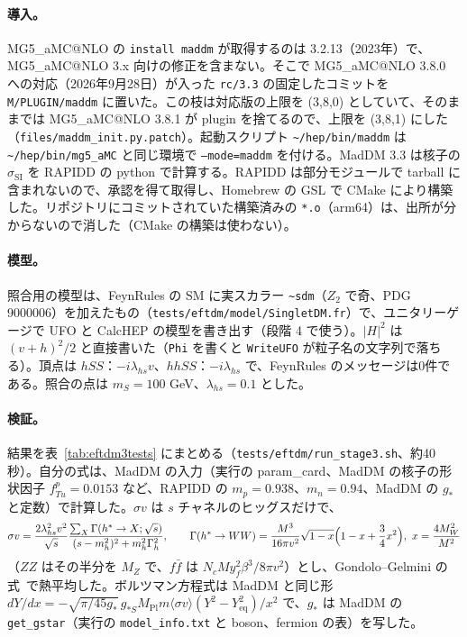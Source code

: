 \documentclass[a4paper,10pt]{ltjsarticle}
\makeatletter
\newcommand{\MGaMC}{MG5\_aMC@NLO}
\newcommand{\pth}[1]{\texttt{\textasciitilde/}\nolinkurl{#1}}
\makeatother
\begin{document}
\paragraph{導入。}\MGaMC{} の \texttt{install maddm} が取得するのは 3.2.13（2023年）で、\MGaMC{} 3.x 向けの修正を含まない。そこで \MGaMC{} 3.8.0 への対応（2026年9月28日）が入った \texttt{rc/3.3} の固定したコミットを \texttt{M/PLUGIN/maddm} に置いた。この枝は対応版の上限を (3,8,0) としていて、そのままでは \MGaMC{} 3.8.1 が plugin を捨てるので、上限を (3,8,1) にした（\nolinkurl{files/maddm_init.py.patch}）。起動スクリプト \pth{hep/bin/maddm} は \pth{hep/bin/mg5_aMC} と同じ環境で \texttt{--mode=maddm} を付ける。MadDM 3.3 は核子の $\sigma_{\mathrm{SI}}$ を RAPIDD の python で計算する。RAPIDD は部分モジュールで tarball に含まれないので、承認を得て取得し、Homebrew の GSL で CMake により構築した。リポジトリにコミットされていた構築済みの \texttt{*.o}（arm64）は、出所が分からないので消した（CMake の構築は使わない）。

\paragraph{模型。}照合用の模型は、FeynRules の SM に実スカラー \texttt{\textasciitilde sdm}（$Z_2$ で奇、PDG 9000006）を加えたもの（\nolinkurl{tests/eftdm/model/SingletDM.fr}）で、ユニタリーゲージで UFO と CalcHEP の模型を書き出す（段階 4 で使う）。$|H|^2$ は $(v+h)^2/2$ と直接書いた（\texttt{Phi} を書くと \texttt{WriteUFO} が粒子名の文字列で落ちる）。頂点は $hSS$：$-i\lambda_{hs}v$、$hhSS$：$-i\lambda_{hs}$ で、FeynRules のメッセージは0件である。照合の点は $m_S=100$ GeV、$\lambda_{hs}=0.1$ とした。

\paragraph{検証。}結果を表~\ref{tab:eftdm3tests} にまとめる（\nolinkurl{tests/eftdm/run_stage3.sh}、約40秒）。自分の式は、MadDM の入力（実行の param\_card、MadDM の核子の形状因子 $f_{Tu}^p=0.0153$ など、RAPIDD の $m_p=0.938$、$m_n=0.94$、MadDM の $g_*$ と定数）で計算した。$\sigma v$ は $s$ チャネルのヒッグスだけで、
\[
\sigma v=\frac{2\lambda_{hs}^2v^2}{\sqrt s}\frac{\sum_X\Gamma(h^*\to X;\sqrt s)}{(s-m_h^2)^2+m_h^2\Gamma_h^2},\qquad
\Gamma(h^*\to WW)=\frac{M^3}{16\pi v^2}\sqrt{1-x}\Bigl(1-x+\frac34x^2\Bigr),\ x=\frac{4M_W^2}{M^2}
\]
（$ZZ$ はその半分を $M_Z$ で、$f\bar f$ は $N_cMy_f^2\beta^3/8\pi v^2$）とし、Gondolo--Gelmini の式~\cite{gondologelmini}で熱平均した。ボルツマン方程式は MadDM と同じ形 $dY/dx=-\sqrt{\pi/45g_*}\,g_{*S}M_{\mathrm{Pl}}m\langle\sigma v\rangle(Y^2-Y_{\mathrm{eq}}^2)/x^2$ で、$g_*$ は MadDM の \texttt{get\_gstar}（実行の \texttt{model\_info.txt} と boson、fermion の表）を写した。
\end{document}
